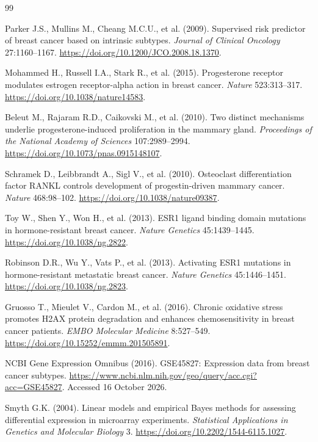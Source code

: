 \begin{thebibliography}{99}
\small\raggedright
{} Parker J.S., Mullins M., Cheang M.C.U., et al. (2009). Supervised risk predictor of breast cancer based on intrinsic subtypes. \textit{Journal of Clinical Oncology} 27:1160--1167. \url{https://doi.org/10.1200/JCO.2008.18.1370}.

 Mohammed H., Russell I.A., Stark R., et al. (2015). Progesterone receptor modulates estrogen receptor-alpha action in breast cancer. \textit{Nature} 523:313--317. \url{https://doi.org/10.1038/nature14583}.

 Beleut M., Rajaram R.D., Caikovski M., et al. (2010). Two distinct mechanisms underlie progesterone-induced proliferation in the mammary gland. \textit{Proceedings of the National Academy of Sciences} 107:2989--2994. \url{https://doi.org/10.1073/pnas.0915148107}.

 Schramek D., Leibbrandt A., Sigl V., et al. (2010). Osteoclast differentiation factor RANKL controls development of progestin-driven mammary cancer. \textit{Nature} 468:98--102. \url{https://doi.org/10.1038/nature09387}.

 Toy W., Shen Y., Won H., et al. (2013). ESR1 ligand binding domain mutations in hormone-resistant breast cancer. \textit{Nature Genetics} 45:1439--1445. \url{https://doi.org/10.1038/ng.2822}.

 Robinson D.R., Wu Y., Vats P., et al. (2013). Activating ESR1 mutations in hormone-resistant metastatic breast cancer. \textit{Nature Genetics} 45:1446--1451. \url{https://doi.org/10.1038/ng.2823}.

 Gruosso T., Mieulet V., Cardon M., et al. (2016). Chronic oxidative stress promotes H2AX protein degradation and enhances chemosensitivity in breast cancer patients. \textit{EMBO Molecular Medicine} 8:527--549. \url{https://doi.org/10.15252/emmm.201505891}.

 NCBI Gene Expression Omnibus (2016). GSE45827: Expression data from breast cancer subtypes. \url{https://www.ncbi.nlm.nih.gov/geo/query/acc.cgi?acc=GSE45827}. Accessed 16 October 2026.

 Smyth G.K. (2004). Linear models and empirical Bayes methods for assessing differential expression in microarray experiments. \textit{Statistical Applications in Genetics and Molecular Biology} 3. \url{https://doi.org/10.2202/1544-6115.1027}.


\end{thebibliography}
